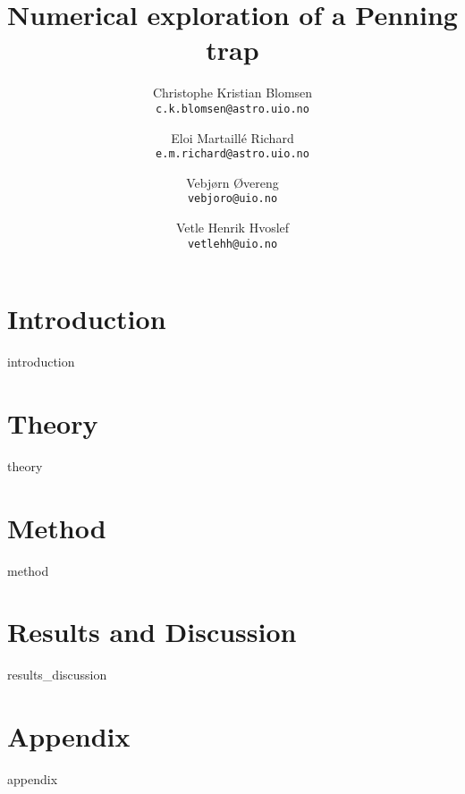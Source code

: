 \documentclass[a4paper,10pt,english]{article}
\title{Numerical exploration of a Penning trap}
\author{Christophe Kristian Blomsen\\
        \texttt{c.k.blomsen@astro.uio.no}
        \and
        Eloi Martaillé Richard\\
        \texttt{e.m.richard@astro.uio.no}
        \and
        Vebjørn Øvereng\\
        \texttt{vebjoro@uio.no}
        \and
        Vetle Henrik Hvoslef\\
        \texttt{vetlehh@uio.no}}
\begin{document}
  \maketitle


\section{Introduction}
{introduction}
\section{Theory}
{theory}

\section{Method}
{method}

\section{Results and Discussion}\label{sec:results}
{results_discussion}

\section{Appendix}\label{sec:app}
{appendix}

\newpage
\newpage
\printbibliography[heading=bibintoc, title={References}]

\end{document}
